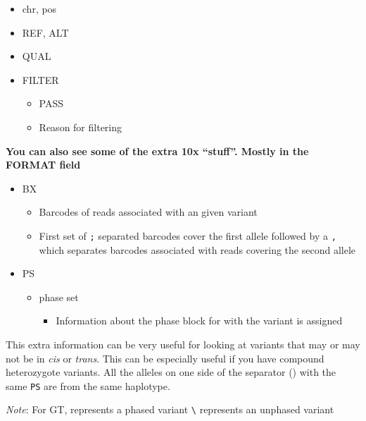 \documentclass[]{article}
\providecommand{\tightlist}{%
  \setlength{\itemsep}{0pt}\setlength{\parskip}{0pt}}
\begin{document}
\begin{itemize}
\tightlist
\item
  chr, pos
\item
  REF, ALT
\item
  QUAL
\item
  FILTER

  \begin{itemize}
  \tightlist
  \item
    PASS
  \item
    Reason for filtering
  \end{itemize}
\end{itemize}

\textbf{You can also see some of the extra 10x ``stuff''. Mostly in the
FORMAT field}

\begin{itemize}
\tightlist
\item
  BX

  \begin{itemize}
  \tightlist
  \item
    Barcodes of reads associated with an given variant
  \item
    First set of \texttt{;} separated barcodes cover the first allele
    followed by a \texttt{,} which separates barcodes associated with
    reads covering the second allele
  \end{itemize}
\item
  PS

  \begin{itemize}
  \tightlist
  \item
    phase set

    \begin{itemize}
    \tightlist
    \item
      Information about the phase block for with the variant is assigned
    \end{itemize}
  \end{itemize}
\end{itemize}

This extra information can be very useful for looking at variants that
may or may not be in \emph{cis} or \emph{trans}. This can be especially
useful if you have compound heterozygote variants. All the alleles on
one side of the separator (\texttt{\textbar{}}) with the same
\texttt{PS} are from the same haplotype.

\emph{Note}: For GT, \texttt{\textbar{}} represents a phased variant
\texttt{\textbackslash{}} represents an unphased variant
\end{document}
